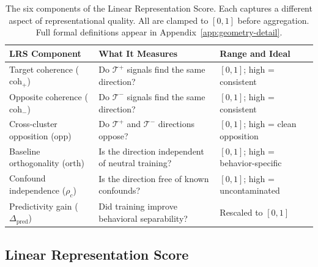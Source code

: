 \documentclass[11pt]{article}
\begin{document}
\begin{table}[h]
\centering
\small
\begin{tabular}{p{}p{}p{}}
\toprule
\textbf{LRS Component} & \textbf{What It Measures} & \textbf{Range and Ideal} \\
\midrule
Target coherence ($\text{coh}_+$) & Do $\mathcal{T}^+$ signals find the same direction? & $[0,1]$; high = consistent \\
Opposite coherence ($\text{coh}_-$) & Do $\mathcal{T}^-$ signals find the same direction? & $[0,1]$; high = consistent \\
Cross-cluster opposition ($\text{opp}$) & Do $\mathcal{T}^+$ and $\mathcal{T}^-$ directions oppose? & $[0,1]$; high = clean opposition \\
Baseline orthogonality ($\text{orth}$) & Is the direction independent of neutral training? & $[0,1]$; high = behavior-specific \\
Confound independence ($\rho_c$) & Is the direction free of known confounds? & $[0,1]$; high = uncontaminated \\
Predictivity gain ($\Delta_{\text{pred}}$) & Did training improve behavioral separability? & Rescaled to $[0,1]$ \\
\bottomrule
\end{tabular}
\caption{The six components of the Linear Representation Score. Each captures a different aspect of representational quality. All are clamped to $[0,1]$ before aggregation. Full formal definitions appear in Appendix~\ref{app:geometry-detail}.}
\label{tab:lrs-components}
\end{table}

\subsection{Linear Representation Score}
\end{document}
